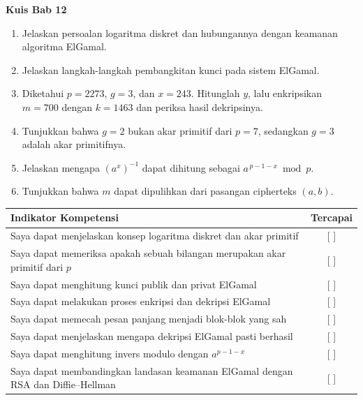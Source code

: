 
\begin{obeassessment}
\textbf{Kuis Bab 12}
\begin{enumerate}
    \item Jelaskan persoalan logaritma diskret dan hubungannya dengan keamanan
          algoritma ElGamal.
    \item Jelaskan langkah-langkah pembangkitan kunci pada sistem ElGamal.
    \item Diketahui $p = 2273$, $g = 3$, dan $x = 243$. Hitunglah $y$, lalu
          enkripsikan $m = 700$ dengan $k = 1463$ dan periksa hasil dekripsinya.
    \item Tunjukkan bahwa $g = 2$ bukan akar primitif dari $p = 7$, sedangkan
          $g = 3$ adalah akar primitifnya.
    \item Jelaskan mengapa $\left(a^{x}\right)^{-1}$ dapat dihitung sebagai
          $a^{\,p-1-x} \bmod p$.
    \item Tunjukkan bahwa $m$ dapat dipulihkan dari pasangan cipherteks
          $(a, b)$.
\end{enumerate}
\end{obeassessment}
\begin{competencychecklist}
\begin{tabularx}{\linewidth}{|X|c|}
\hline
Indikator Kompetensi & Tercapai \\
\hline
Saya dapat menjelaskan konsep logaritma diskret dan akar primitif & [ ] \\
\hline
Saya dapat memeriksa apakah sebuah bilangan merupakan akar primitif dari $p$ & [ ] \\
\hline
Saya dapat menghitung kunci publik dan privat ElGamal & [ ] \\
\hline
Saya dapat melakukan proses enkripsi dan dekripsi ElGamal & [ ] \\
\hline
Saya dapat memecah pesan panjang menjadi blok-blok yang sah & [ ] \\
\hline
Saya dapat menjelaskan mengapa dekripsi ElGamal pasti berhasil & [ ] \\
\hline
Saya dapat menghitung invers modulo dengan $a^{p-1-x}$ & [ ] \\
\hline
Saya dapat membandingkan landasan keamanan ElGamal dengan RSA dan Diffie--Hellman & [ ] \\
\hline
\end{tabularx}
\end{competencychecklist}

